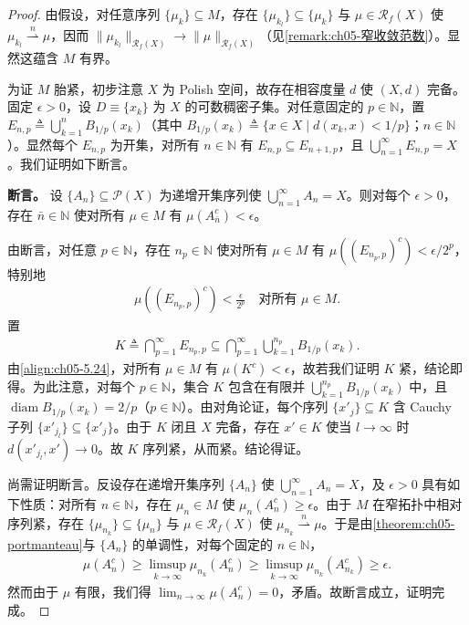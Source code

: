 \documentclass[../../main.tex]{subfiles}%
\begin{document}
\begin{proof}
由假设，对任意序列 $\{\mu_k\}\subseteq M$，存在 $\{\mu_{k_l}\}\subseteq\{\mu_k\}$ 与 $\mu\in\mathscr{R}_f(X)$ 使 $\mu_{k_l}\stackrel{n}{\rightharpoonup}\mu$，因而 $\|\mu_{k_l}\|_{\mathscr{R}_f(X)}\to\|\mu\|_{\mathscr{R}_f(X)}$（见\cref{remark:ch05-窄收敛范数}）。显然这蕴含 $M$ 有界。

为证 $M$ 胎紧，初步注意 $X$ 为 Polish 空间，故存在相容度量 $d$ 使 $(X,d)$ 完备。固定 $\epsilon>0$，设 $D\equiv\{x_k\}$ 为 $X$ 的可数稠密子集。对任意固定的 $p\in\mathbb{N}$，置 $E_{n,p}\triangleq \bigcup_{k=1}^n B_{1/p}(x_k)$（其中 $B_{1/p}(x_k)\triangleq \{x\in X\mid d(x_k,x)<1/p\}$；$n\in\mathbb{N}$）。显然每个 $E_{n,p}$ 为开集，对所有 $n\in\mathbb{N}$ 有 $E_{n,p}\subseteq E_{n+1,p}$，且 $\bigcup_{n=1}^\infty E_{n,p}=X$。我们证明如下断言。

\textbf{断言。} 设 $\{A_n\}\subseteq\mathcal{P}(X)$ 为递增开集序列使 $\bigcup_{n=1}^\infty A_n=X$。则对每个 $\epsilon>0$，存在 $\bar{n}\in\mathbb{N}$ 使对所有 $\mu\in M$ 有 $\mu(A_{\bar{n}}^c)<\epsilon$。

由断言，对任意 $p\in\mathbb{N}$，存在 $n_p\in\mathbb{N}$ 使对所有 $\mu\in M$ 有 $\mu((E_{n_p,p})^c)<\epsilon/2^p$，特别地
\begin{align}
\mu((E_{n_p,p})^c)<\frac{\epsilon}{2^p}
\quad\text{对所有 }\mu\in M.\label{align:ch05-5.24}
\end{align}
置
\begin{align*}
K\triangleq \bigcap_{p=1}^\infty E_{n_p,p}\subseteq\bigcap_{p=1}^\infty\bigcup_{k=1}^{n_p}B_{1/p}(x_k).
\end{align*}
由\eqref{align:ch05-5.24}，对所有 $\mu\in M$ 有 $\mu(K^c)<\epsilon$，故若我们证明 $K$ 紧，结论即得。为此注意，对每个 $p\in\mathbb{N}$，集合 $K$ 包含在有限并 $\bigcup_{k=1}^{n_p}B_{1/p}(x_k)$ 中，且 $\operatorname{diam}B_{1/p}(x_k)=2/p$（$p\in\mathbb{N}$）。由对角论证，每个序列 $\{x'_j\}\subseteq K$ 含 Cauchy 子列 $\{x'_{j_l}\}\subseteq\{x'_j\}$。由于 $K$ 闭且 $X$ 完备，存在 $x'\in K$ 使当 $l\to\infty$ 时 $d(x'_{j_l},x')\to0$。故 $K$ 序列紧，从而紧。结论得证。

尚需证明断言。反设存在递增开集序列 $\{A_n\}$ 使 $\bigcup_{n=1}^\infty A_n=X$，及 $\epsilon>0$ 具有如下性质：对所有 $n\in\mathbb{N}$，存在 $\mu_n\in M$ 使 $\mu_n(A_n^c)\geqslant\epsilon$。由于 $M$ 在窄拓扑中相对序列紧，存在 $\{\mu_{n_k}\}\subseteq\{\mu_n\}$ 与 $\mu\in\mathscr{R}_f(X)$ 使 $\mu_{n_k}\stackrel{n}{\rightharpoonup}\mu$。于是由\cref{theorem:ch05-portmanteau}与 $\{A_n\}$ 的单调性，对每个固定的 $n\in\mathbb{N}$，
\begin{align*}
\mu(A_n^c)\geqslant\limsup_{k\to\infty}\mu_{n_k}(A_n^c)
\geqslant\limsup_{k\to\infty}\mu_{n_k}(A_{n_k}^c)\geqslant\epsilon.
\end{align*}
然而由于 $\mu$ 有限，我们得 $\lim_{n\to\infty}\mu(A_n^c)=0$，矛盾。故断言成立，证明完成。
\end{proof}
\end{document}
